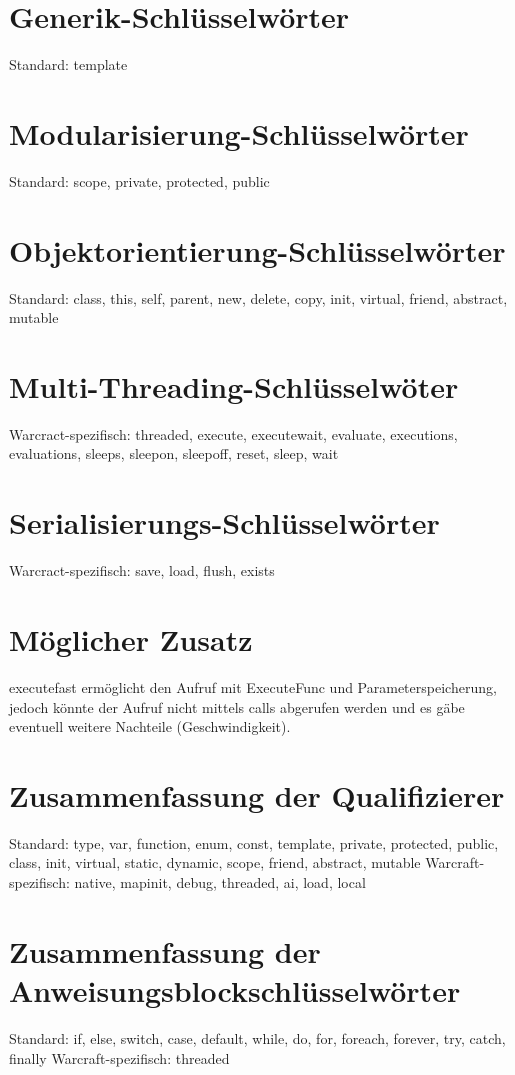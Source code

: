 \section{Generik-Schlüsselwörter}
Standard: template

\section{Modularisierung-Schlüsselwörter}
Standard: scope, private, protected, public

\section{Objektorientierung-Schlüsselwörter}
Standard: class, this, self, parent, new, delete, copy, init, virtual, friend, abstract, mutable

\section{Multi-Threading-Schlüsselwöter}
Warcract-spezifisch: threaded, execute, executewait, evaluate, executions, evaluations, sleeps, sleepon, sleepoff, reset, sleep, wait

\section{Serialisierungs-Schlüsselwörter}
Warcract-spezifisch: save, load, flush, exists

\section{Möglicher Zusatz}
executefast ermöglicht den Aufruf mit ExecuteFunc und Parameterspeicherung, jedoch könnte
der Aufruf nicht mittels calls abgerufen werden und es gäbe eventuell weitere Nachteile
(Geschwindigkeit).

\section{Zusammenfassung der Qualifizierer}
Standard: type, var, function, enum, const, template, private, protected, public, class, init, virtual, static, dynamic, scope, friend, abstract, mutable
Warcraft-spezifisch: native, mapinit, debug, threaded, ai, load, local

\section{Zusammenfassung der Anweisungsblockschlüsselwörter}
Standard: if, else, switch, case, default, while, do, for, foreach, forever, try, catch, finally
Warcraft-spezifisch: threaded

